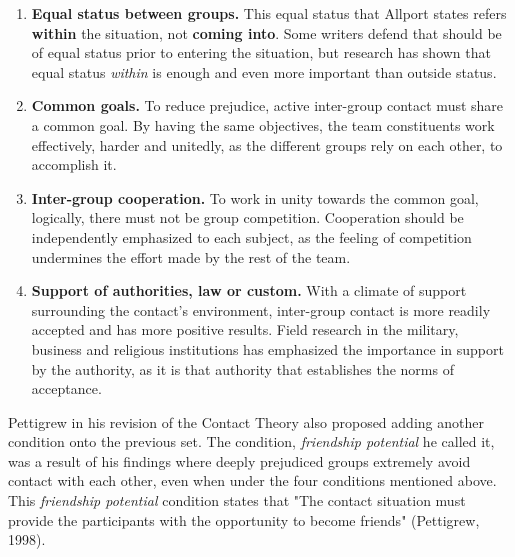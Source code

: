 \documentclass[runningheads]{llncs}
\begin{document}
\begin{enumerate}
\item \textbf{Equal status between groups.} This equal status that Allport states refers \textbf{within} the situation, not \textbf{coming into}. Some writers defend that should be of equal status prior to entering the situation, but research has shown that equal status \textit{within} is enough and even more important than outside status.
\item \textbf{Common goals.} To reduce prejudice, active inter-group contact must share a common goal. By having the same objectives, the team constituents work effectively, harder and unitedly, as the different groups rely on each other, to accomplish it.
\item \textbf{Inter-group cooperation.} To work in unity towards the common goal, logically, there must not be group competition. Cooperation should be independently emphasized to each subject, as the feeling of competition undermines the effort made by the rest of the team.
\item \textbf{Support of authorities, law or custom.} With a climate of support surrounding the contact's environment, inter-group contact is more readily accepted and has more positive results. Field research in the military, business and religious institutions has emphasized the importance in support by the authority, as it is that authority that establishes the norms of acceptance.
\end{enumerate}

\par Pettigrew in his revision of the Contact Theory also proposed adding another condition onto the previous set. The condition, \textit{friendship potential} he called it, was a result of his findings where deeply prejudiced groups extremely avoid contact with each other, even when under the four conditions mentioned above. This \textit{friendship potential} condition states that "The contact situation must provide the participants with the opportunity to become friends" (Pettigrew, 1998).
\end{document}
